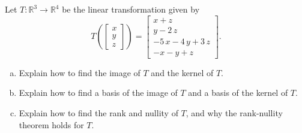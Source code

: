 
\begin{exerciseStatement}
 Let \(T:\mathbb{R}^ 3  \to \mathbb{R}^ 4 \) be the linear transformation given by \[T\left(  \left[\begin{array}{c}
x \\
y \\
z
\end{array}\right]  \right) =  \left[\begin{array}{c}
x + z \\
y - 2 \, z \\
-5 \, x - 4 \, y + 3 \, z \\
-x - y + z
\end{array}\right] .\]
\begin{enumerate}[(a)]
\item Explain how to find the image of \(T\) and the kernel of \(T\).
\item Explain how to find a basis of the image of \(T\) and a basis of the kernel of \(T\).
\item Explain how to find the rank and nullity of \(T\), and why the rank-nullity theorem holds for \(T\).
\end{enumerate}
    
\end{exerciseStatement}
    
